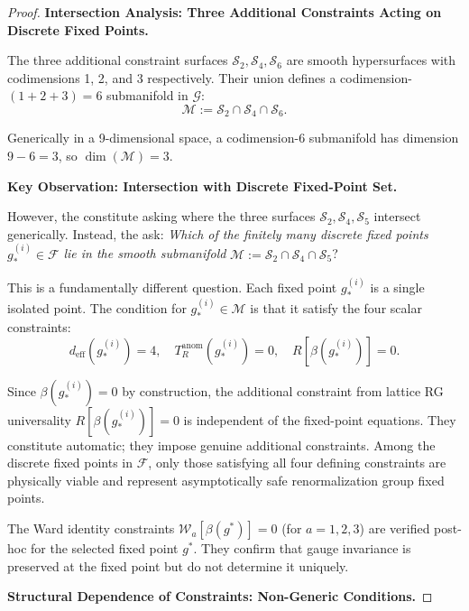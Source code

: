 \begin{theorem}
\begin{proof}
\textbf{Intersection Analysis: Three Additional Constraints Acting on Discrete Fixed Points.}

The three additional constraint surfaces $\mathcal{S}_2, \mathcal{S}_4, \mathcal{S}_6$ are smooth hypersurfaces with codimensions 1, 2, and 3 respectively. Their union defines a codimension-$(1+2+3)=6$ submanifold in $\mathcal{G}$:
\begin{equation}
\mathcal{M} := \mathcal{S}_2 \cap \mathcal{S}_4 \cap \mathcal{S}_6.
\end{equation}

Generically in a 9-dimensional space, a codimension-6 submanifold has dimension $9 - 6 = 3$, so $\dim(\mathcal{M}) = 3$.

\textbf{Key Observation: Intersection with Discrete Fixed-Point Set.}

However, the constitute asking where the three surfaces $\mathcal{S}_2, \mathcal{S}_4, \mathcal{S}_5$ intersect generically. Instead, the ask: \emph{Which of the finitely many discrete fixed points} $g^{(i)}_* \in \mathcal{F}$ \emph{lie in the smooth submanifold} $\mathcal{M} := \mathcal{S}_2 \cap \mathcal{S}_4 \cap \mathcal{S}_5$?

This is a fundamentally different question. Each fixed point $g^{(i)}_*$ is a single isolated point. The condition for $g^{(i)}_* \in \mathcal{M}$ is that it satisfy the four scalar constraints:
\begin{equation}
d_{\text{eff}}(g^{(i)}_*) = 4, \quad T_R^{\text{anom}}(g^{(i)}_*) = 0, \quad R[\beta(g^{(i)}_*)] = 0.
\end{equation}

Since $\beta(g^{(i)}_*) = 0$ by construction, the additional constraint from lattice RG universality $R[\beta(g^{(i)}_*)] = 0$ is independent of the fixed-point equations. They constitute automatic; they impose genuine additional constraints. Among the discrete fixed points in $\mathcal{F}$, only those satisfying all four defining constraints are physically viable and represent asymptotically safe renormalization group fixed points.

The Ward identity constraints $\mathcal{W}_a[\beta(g^*)] = 0$ (for $a = 1, 2, 3$) are verified post-hoc for the selected fixed point $g^*$. They confirm that gauge invariance is preserved at the fixed point but do not determine it uniquely.

\textbf{Structural Dependence of Constraints: Non-Generic Conditions.}


\end{proof}
\end{theorem}
